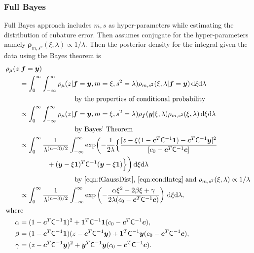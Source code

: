 \documentclass[twocolumn]{svjour3}          %
\newcommand{\bm}[1]{\boldsymbol{#1}}
\newcommand{\D}[1]{\text{d}{#1}}
\newcommand{\vc}{\bm{c}}
\newcommand{\vf}{\bm{f}}
\newcommand{\vrho}{\bm{\rho}}
\newcommand{\vy}{\bm{y}}
\newcommand{\vone}{\bm{1}}
\newcommand{\mC}{\mathsf{C}}
\begin{document}
\subsubsection{Full Bayes}

Full Bayes approach includes $m, s$ as hyper-parameters
 while estimating the distribution of cubature error. Then assumes conjugate for the hyper-parameters namely $\vrho_{m,s^2}(\xi, \lambda) \propto 1/\lambda$. Then the posterior density for the integral given the data using the Bayes theorem is
\begin{align*}
\MoveEqLeft{\rho_{\mu}(z | \vf = \vy)} \\
& = \int_{0}^\infty \int_{-\infty}^\infty \rho_{\mu}(z | \vf = \vy, m = \xi, s^2 = \lambda) \rho_{m, s^2}(\xi, \lambda | \vf = \vy ) \, \D \xi \D \lambda \\
&\qquad \qquad \qquad \qquad \text{by the properties of conditional probability} \\
& \propto \int_{0}^\infty \int_{-\infty}^\infty \rho_{\mu}(z | \vf = \vy, m = \xi, s^2 = \lambda)  \rho_{\vf}(\vy | \xi, \lambda ) \rho_{m, s^2}(\xi, \lambda) \, \D \xi \D \lambda \\
&\qquad \qquad \qquad \qquad \text{by Bayes' Theorem} \\
& \propto \displaystyle \int_{0}^\infty  \frac{1}{\lambda^{(n+3)/2}} \int_{-\infty}^\infty  \exp \biggl( -\frac{1}{2\lambda}\Bigl\{
\frac{
[z - \xi (1 - \vc^T \mC^{-1} \vone)  -  \vc^T \mC^{-1} \vy]^2}
{[c_0  -\vc ^T \mC^{-1} \vc]}  \\
& \qquad \qquad  + (\vy - \xi \vone)^T \mC^{-1}(\vy - \xi \vone) \Bigr \} \biggr) \, \D \xi \D \lambda \\
&\qquad \qquad \qquad \qquad  
\text{by \eqref{eqn:fGaussDist}, \eqref{eqn:condInteg}} \; \text{and} \; \rho_{m,s^2}(\xi,\lambda) \propto 1/\lambda \\
& \propto \displaystyle \int_{0}^\infty  \frac{1}{\lambda^{(n+3)/2}} \int_{-\infty}^\infty  \exp\left( -\frac{\alpha \xi^2 -2 \beta \xi + \gamma}{2\lambda(c_0  -\vc ^T \mC^{-1} \vc)} \right) \, \D \xi \D \lambda, \\
\intertext{where}
\alpha & = (1 - \vc^T \mC^{-1} \vone)^2 + \vone^T \mC^{-1} \vone (c_0  -\vc ^T \mC^{-1} \vc),\\
\beta & =(1 - \vc^T \mC^{-1} \vone)(z - \vc^T \mC^{-1} \vy )  + \vone^T \mC^{-1} \vy (c_0  -\vc ^T \mC^{-1} \vc),\\
\gamma &  = (z - \vc^T \mC^{-1} \vy )^2  + \vy^T \mC^{-1} \vy (c_0  -\vc ^T \mC^{-1} \vc).
\end{align*}
\end{document}
